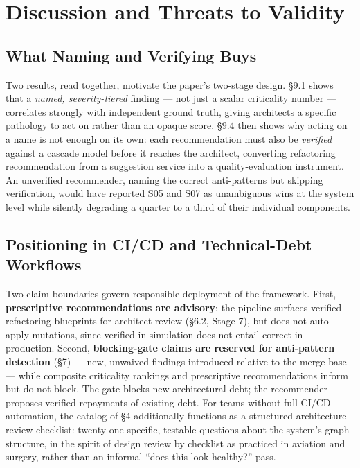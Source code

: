 \documentclass[11pt]{article}
\begin{document}
\section{Discussion and Threats to Validity}

\subsection{What Naming and Verifying Buys}

Two results, read together, motivate the paper's two-stage design. \S9.1 shows that a \emph{named,
severity-tiered} finding --- not just a scalar criticality number --- correlates strongly with
independent ground truth, giving architects a specific pathology to act on rather than an opaque
score. \S9.4 then shows why acting on a name is not enough on its own: each recommendation must also
be \emph{verified} against a cascade model before it reaches the architect, converting refactoring
recommendation from a suggestion service into a quality-evaluation instrument. An unverified
recommender, naming the correct anti-patterns but skipping verification, would have reported S05 and
S07 as unambiguous wins at the system level while silently degrading a quarter to a third of their
individual components.

\subsection{Positioning in CI/CD and Technical-Debt Workflows}

Two claim boundaries govern responsible deployment of the framework. First, \textbf{prescriptive
recommendations are advisory}: the pipeline surfaces verified refactoring blueprints for architect
review (\S6.2, Stage 7), but does not auto-apply mutations, since verified-in-simulation does not
entail correct-in-production. Second, \textbf{blocking-gate claims are reserved for anti-pattern
detection} (\S7) --- new, unwaived findings introduced relative to the merge base --- while composite
criticality rankings and prescriptive recommendations inform but do not block. The gate blocks new
architectural debt; the recommender proposes verified repayments of existing debt. For teams without
full CI/CD automation, the catalog of \S4 additionally functions as a structured architecture-review
checklist: twenty-one specific, testable questions about the system's graph structure, in the spirit
of design review by checklist as practiced in aviation and surgery, rather than an informal ``does
this look healthy?'' pass.
\end{document}
